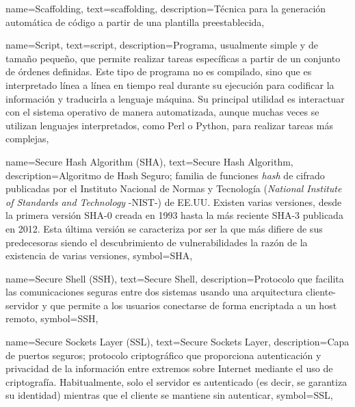 {
    name={Scaffolding},
    text={scaffolding},
    description={Técnica para la generación automática de código a partir de una plantilla preestablecida},
}

{
    name={Script},
    text={script},
    description={Programa, usualmente simple y de tamaño pequeño, que permite realizar tareas específicas a partir de un conjunto de órdenes definidas. Este tipo de programa no es compilado, sino que es interpretado línea a línea en tiempo real durante su ejecución para codificar la información y traducirla a lenguaje máquina. Su principal utilidad es interactuar con el sistema operativo de manera automatizada, aunque muchas veces se utilizan lenguajes interpretados, como Perl o Python, para realizar tareas más complejas},
}

{
    name={Secure Hash Algorithm (SHA)},
    text={Secure Hash Algorithm},
    description={Algoritmo de Hash Seguro; familia de funciones \textit{hash} de cifrado 
    publicadas por el Instituto Nacional de Normas y Tecnología (\textit{National Institute of Standards and Technology} -NIST-)​ de EE.UU. Existen varias versiones, desde la primera versión SHA-0 creada en 1993 hasta la más reciente SHA-3 publicada en 2012. Esta  última versión se caracteriza por ser la que más difiere de sus predecesoras siendo el descubrimiento de vulnerabilidades la razón de la existencia de varias versiones},
    symbol={SHA},
}

{
    name={Secure Shell (SSH)},
    text={Secure Shell},
    description={Protocolo que facilita las comunicaciones seguras entre dos sistemas usando una arquitectura cliente-servidor y que permite a los usuarios conectarse de forma encriptada a un host remoto},
    symbol={SSH},
}

{
    name={Secure Sockets Layer (SSL)},
    text={Secure Sockets Layer},
    description={Capa de puertos seguros; protocolo criptográfico que proporciona autenticación y privacidad de la información entre extremos sobre Internet mediante el uso de criptografía. Habitualmente, solo el servidor es autenticado (es decir, se garantiza su identidad) mientras que el cliente se mantiene sin autenticar},
    symbol={SSL},
}

